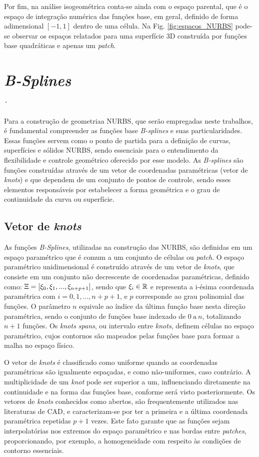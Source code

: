\documentclass[tese_patricia]{subfiles}
\begin{document}
Por fim, na análise isogeométrica conta-se ainda com o espaço parental, que é o espaço de integração numérica das funções base, em geral, definido de forma adimensional $[-1, 1]$ dentro de uma célula. Na Fig. \ref{fig:espacos_NURBS} pode-se observar os espaços relatados para uma superfície 3D construída por funções base quadráticas e apenas um \textit{patch}. 

\section{\textit{B-Splines}} \label{capitulo:Cap3:Bsplines}´

Para a construção de geometriaa NURBS, que serão empregadas neste trabalhos, é fundamental compreender as funções base \textit{B-splines} e suas particularidades. Essas funções servem como o ponto de partida para a definição de curvas, superfícies e sólidos NURBS, sendo essenciais para o entendimento da flexibilidade e controle geométrico oferecido por esse modelo. As \textit{B-splines} são funções construídas através de um vetor de coordenadas paramétricas (vetor de \textit{knots}) e que dependem de um conjunto de pontos de controle, sendo esses elementos responsáveis por estabelecer a forma geométrica e o grau de continuidade da curva ou superfície.

\subsection{Vetor de \textit{knots}}

As funções \textit{B-Splines}, utilizadas na construção das NURBS, são definidas em um espaço paramétrico que é comum a um conjunto de células ou \textit{patch}. O espaço paramétrico unidimensional é construído através de um vetor de \textit{knots}, que consiste em um conjunto não decrescente de coordenadas paramétricas, definido como: $\Xi=\left[\xi_{0},\xi_{1},...,\xi_{n+p+1}\right]$,  sendo que $\xi_{i}\in \mathbb{R}$ e representa a i-ésima coordenada paramétrica  com $i = 0, 1, ..., n+p+1$, e $p$ corresponde ao grau polinomial das funções. O parâmetro $n$ equivale ao índice da última função base nesta direção paramétrica, sendo o conjunto de funções base indexado de $0 \ \text{a}  \ n$, totalizando $n+1$ funções. Os \textit{knots spans}, ou intervalo entre \textit{knots}, definem células no espaço paramétrico, cujos contornos são mapeados pelas funções base para formar a malha no espaço físico. 

O vetor de \textit{knots} é classificado como uniforme quando as coordenadas paramétricas são igualmente espaçadas, e como não-uniformes, caso contrário. A multiplicidade de um \textit{knot} pode ser superior a um, influenciando diretamente na continuidade e na forma das funções base, conforme será visto posteriormente.  Os vetores de \textit{knots} conhecidos como abertos, são frequentemente utilizados nas literaturas de CAD, e caracterizam-se por ter a primeira e a última coordenada paramétrica repetidas $p+1$ vezes. Este fato garante que as funções sejam interpolatórias nos extremos do espaço paramétrico e nas bordas entre \textit{patches}, proporcionando, por exemplo, a homogeneidade com respeito às condições de contorno essenciais. 
\end{document}

